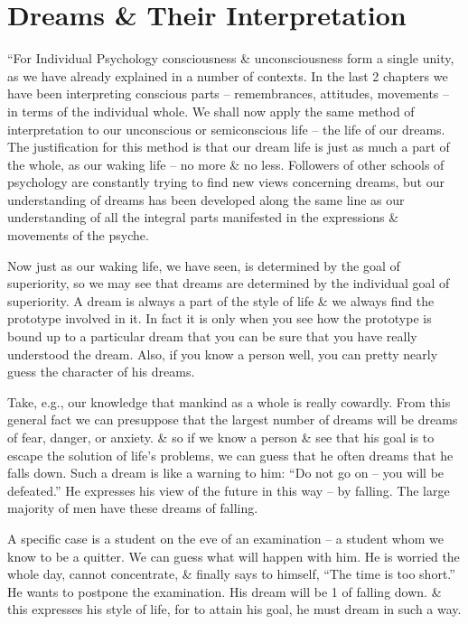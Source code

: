 \documentclass{article}
\numberwithin{equation}{section}
\begin{document}

\section{Dreams \& Their Interpretation}
``For Individual Psychology consciousness \& unconsciousness form a single unity, as we have already explained in a number of contexts. In the last 2 chapters we have been interpreting conscious parts -- remembrances, attitudes, movements -- in terms of the individual whole. We shall now apply the same method of interpretation to our unconscious or semiconscious life -- the life of our dreams. The justification for this method is that our dream life is just as much a part of the whole, as our waking life -- no more \& no less. Followers of other schools of psychology are constantly trying to find new views concerning dreams, but our understanding of dreams has been developed along the same line as our understanding of all the integral parts manifested in the expressions \& movements of the psyche.

Now just as our waking life, we have seen, is determined by the goal of superiority, so we may see that dreams are determined by the individual goal of superiority. A dream is always a part of the style of life \& we always find the prototype involved in it. In fact it is only when you see how the prototype is bound up to a particular dream that you can be sure that you have really understood the dream. Also, if you know a person well, you can pretty nearly guess the character of his dreams.

Take, e.g., our knowledge that mankind as a whole is really cowardly. From this general fact we can presuppose that the largest number of dreams will be dreams of fear, danger, or anxiety. \& so if we know a person \& see that his goal is to escape the solution of life's problems, we can guess that he often dreams that he falls down. Such a dream is like a warning to him: ``Do not go on -- you will be defeated.'' He expresses his view of the future in this way -- by falling. The large majority of men have these dreams of falling.

A specific case is a student on the eve of an examination -- a student whom we know to be a quitter. We can guess what will happen with him. He is worried the whole day, cannot concentrate, \& finally says to himself, ``The time is too short.'' He wants to postpone the examination. His dream will be 1 of falling down. \& this expresses his style of life, for to attain his goal, he must dream in such a way.
\end{document}
